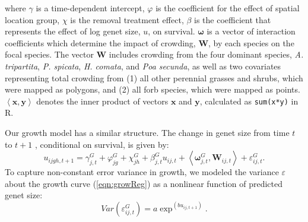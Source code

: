 \documentclass[11pt]{article}
\begin{document}
\begin{doublespacing}

where $\gamma$ is a time-dependent intercept, $\varphi$ is the coefficient for the effect of spatial location group, $\chi$ is the removal treatment effect, $\beta$ is the coefficient that represents the effect of log genet size, $u$, on survival. $\boldsymbol{\omega}$ is a vector of interaction coefficients which determine the impact of crowding, $\boldsymbol{W}$, by each species on the focal species. The vector $\boldsymbol{W}$ includes crowding from the four dominant species,  \textit{A. tripartita}, \textit{P. spicata}, \textit{H. comata}, and \textit{Poa secunda}, as well as two covariates representing total crowding from (1) all other perennial grasses and shrubs, which were mapped as polygons, and (2) all forb species, which were mapped as points. 
$\left \langle \boldsymbol{x, y} \right \rangle$ denotes the inner product of vectors $\boldsymbol{x}$ and $\boldsymbol{y}$, 
calculated as \texttt{sum(x*y)} in R.

Our growth model has a similar structure. The change in genet size from time $t$ to $t+1$ , conditional on survival, is given by:
\begin{equation}
u_{ijgh,t+1} = \gamma_{j,t}^G + \varphi_{jg}^G+  \chi_{jh}^G  + \beta_{j,t}^G u_{ij,t} + 
\left \langle  \boldsymbol{\omega}_{j,t}^G, \boldsymbol{W}_{ij,t} \right \rangle + \varepsilon_{ij,t}^G .
\label{eqn:growReg}
\end{equation}
To capture non-constant error variance in growth, we modeled the variance $\varepsilon$  about the growth curve (\ref{eqn:growReg})  as a nonlinear function of predicted genet size:
\begin{equation}
Var(\varepsilon_{ij,t}^G) = a \exp ^{(bu_{ij,t+1})} .
\label{eqn:growVar}
\end{equation}


\end{doublespacing}
\end{document}
